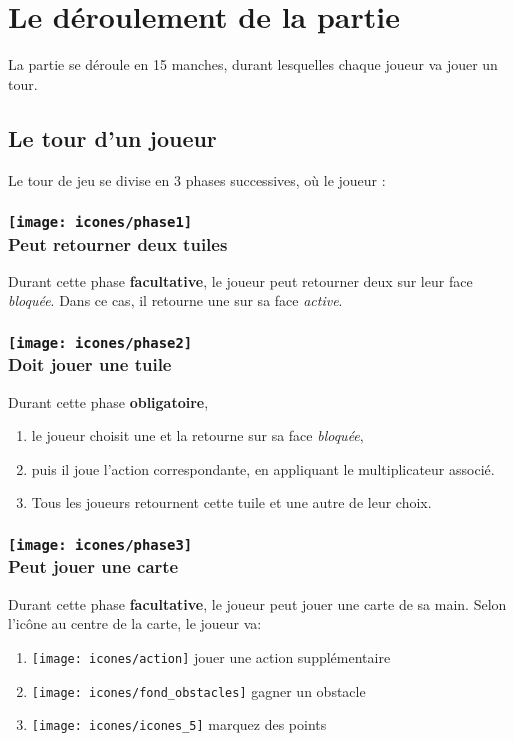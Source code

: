 \section*{Le déroulement de la partie} \label{sec:tourDeJeu}
La partie se déroule en 15 manches, durant lesquelles chaque joueur va jouer un tour.

\subsection*{Le tour d'un joueur} \label{sec:tourDeJoueur}
Le tour de jeu se divise en 3 phases successives, où le joueur :
\subsubsection*{\texttt{[image: icones/phase1]} \\ Peut retourner deux tuiles}
Durant cette phase \textbf{facultative}, le joueur peut retourner deux \tuilesActives sur leur face \textit{bloquée}. Dans ce cas, il retourne une \tuileBloquee sur sa face \textit{active}.

\subsubsection*{\texttt{[image: icones/phase2]} \\ Doit jouer une tuile}
Durant cette phase \textbf{obligatoire},
\begin{enumerate}
\item le joueur choisit une \tuileActive et la retourne sur sa face \textit{bloquée},
\item puis il joue l'action correspondante, en appliquant le multiplicateur associé.
\item Tous les joueurs retournent cette tuile et une autre de leur choix.
\end{enumerate}

\subsubsection*{\texttt{[image: icones/phase3]} \\ Peut jouer une carte}
Durant cette phase \textbf{facultative}, le joueur peut jouer une carte de sa main. Selon l'icône au centre de la carte, le joueur va:
\begin{enumerate}
\item \texttt{[image: icones/action]} jouer une action supplémentaire
\item \texttt{[image: icones/fond\_obstacles]} gagner un obstacle
\item \texttt{[image: icones/icones\_5]} marquez des points
\end{enumerate}

